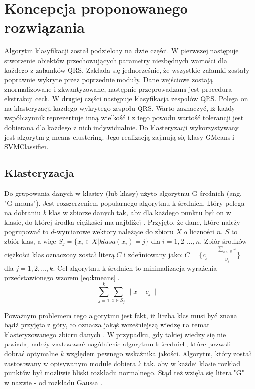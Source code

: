 \section{Koncepcja proponowanego rozwiązania}

\qquad Algorytm klasyfikacji został podzielony na dwie części. W pierwszej następuje stworzenie obiektów przechowujących parametry niezbędnych wartości dla każdego z załamków QRS. Zakłada się jednocześnie, że wszystkie załamki zostały poprawnie wykryte przez poprzednie moduły. Dane wejściowe zostają znormalizowane i zkwantyzowane, następnie przeprowadzana jest procedura ekstrakcji cech. W drugiej części następuje klasyfikacja zespołów QRS. Polega on na  klasteryzacji każdego wykrytego zespołu QRS. Warto zaznaczyć, iż każdy współczynnik reprezentuje inną wielkość i z tego powodu wartość tolerancji jest dobierana dla każdego z nich indywidualnie. Do klasteryzacji wykorzystywany jest algorytm g-means clustering. Jego realizacją zajmują się klasy GMeans i SVMClassifier.

\subsection{Klasteryzacja}

\qquad Do grupowania danych w klastry (lub klasy) użyto algorytmu G-średnich (ang. "G-means"). Jest rozszerzeniem popularnego algorytmu k-średnich, który polega na dobraniu $k$ klas w zbiorze danych tak, aby dla każdego punktu był on w klasie, do której środka ciężkości ma najbliżej \cite{KMeans}. Przyjęto, że dane, które należy pogrupować to $d$-wymiarowe wektory należące do zbioru $X$ o liczności $n$. $S$ to zbiór klas, a więc $S_{j} = \{x_{i} \in X | klasa(x_{i}) = j\}$ dla $i = 1, 2, ..., n$. Zbiór środków ciężkości klas oznaczony został literą $C$ i zdefiniowany jako: $C = \{c_{j} = \frac{\sum_{x \in S_{j}} x}{|S_{j}|}\}$ dla $j = 1, 2, ..., k$.
Cel algorytmu k-średnich to minimalizacja wyrażenia przedstawionego wzorem \ref{eq:kmeans} .
\begin{equation}
\label{eq:kmeans}
\sum_{j=1}^{k}\sum_{x \in S_{j}} \|x - c_{j}\|
\end{equation}

Poważnym problemem tego algorytmu jest fakt, iż liczba klas musi być znana bądź przyjęta z góry, co oznacza jakąś wcześniejszą wiedzę na temat klasteryzowanego zbioru danych \cite{GMeans, GMeansExplanation}. W przypadku, gdy takiej wiedzy się nie posiada, należy zastosować uogólnienie algorytmu k-średnich, które pozwoli dobrać optymalne $k$ względem pewnego wskaźnika jakości.
Algorytm, który został zastosowany w opisywanym module dobiera $k$ tak, aby w każdej klasie rozkład punktów był możliwie bliski rozkładu normalnego. Stąd też wzięła się litera "G" w nazwie - od rozkładu Gaussa \cite{GMeans}.

